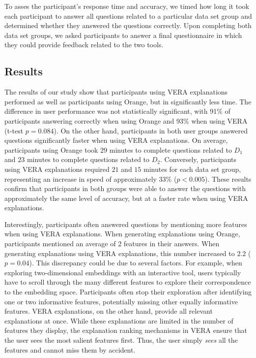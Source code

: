 \documentclass[lettersize,journal]{IEEEtran}
\begin{document}
To asses the participant's response time and accuracy, we timed how long it took each participant to answer all questions related to a particular data set group and determined whether they answered the questions correctly. Upon completing both data set groups, we asked participants to answer a final questionnaire in which they could provide feedback related to the two tools.

\subsection{Results}

The results of our study show that participants using VERA explanations performed as well as participants using Orange, but in significantly less time.
The difference in user performance was not statistically significant, with 91\% of participants answering correctly when using Orange and 93\% when using VERA (t-test $p=0.084$).
On the other hand, participants in both user groups answered questions significantly faster when using VERA explanations. On average, participants using Orange took $29$ minutes to complete questions related to $D_1$ and $23$ minutes to complete questions related to $D_2$. Conversely, participants using VERA explanations required $21$ and $15$ minutes for each data set group, representing an increase in speed of approximately 33\% ($p<0.005$).
These results confirm that participants in both groups were able to answer the questions with approximately the same level of accuracy, but at a faster rate when using VERA explanations.

Interestingly, participants often answered questions by mentioning more features when using VERA explanations. When generating explanations using Orange, participants mentioned an average of $2$ features in their answers. When generating explanations using VERA explanations, this number increased to $2.2$ ($p=0.04$). This discrepancy could be due to several factors. For example, when exploring two-dimensional embeddings with an interactive tool, users typically have to scroll through the many different features to explore their correspondence to the embedding space. Participants often stop their exploration after identifying one or two informative features, potentially missing other equally informative features. VERA explanations, on the other hand, provide all relevant explanations at once. While these explanations are limited in the number of features they display, the explanation ranking mechanisms in VERA ensure that the user sees the most salient features first. Thus, the user simply \textit{sees} all the features and cannot miss them by accident.
\end{document}
